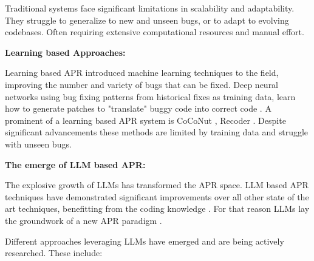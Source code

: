 Traditional systems face significant limitations in scalability and adaptability. They struggle to generalize to new and unseen bugs, or to adapt to evolving codebases. Often requiring extensive computational resources and manual effort. \cite{puvvadiCodingAgentsComprehensive2025, xiaAutomatedProgramRepair2024}


\textbf{Learning based Approaches:}

Learning based APR introduced machine learning techniques to the field, improving the number and variety of bugs that can be fixed. Deep neural networks using bug fixing patterns from historical fixes as training data, learn how to generate patches to "translate" buggy code into correct code \cite{xiaAutomatedProgramRepair2023, tangLargeLanguageModels2024}. A prominent of a learning based APR system is CoCoNut \cite{lutellierCoCoNuTCombiningContextaware2020}, Recoder \cite{zhuSyntaxguidedEditDecoder2021}. Despite significant advancements these methods are limited by training data and struggle with unseen bugs. \cite{xiaLessTrainingMore2022}

\textbf{The emerge of LLM based APR:}

The explosive growth of LLMs has transformed the APR space. LLM based APR techniques have demonstrated significant improvements over all other state of the art techniques, benefitting from the coding knowledge \cite{hossainDeepDiveLarge2024}. For that reason LLMs lay the groundwork of a new APR paradigm \cite{chenUnveilingPitfallsUnderstanding2025, anandComprehensiveSurveyAIDriven2024}.

Different approaches leveraging LLMs have emerged and are being actively researched. These include:

